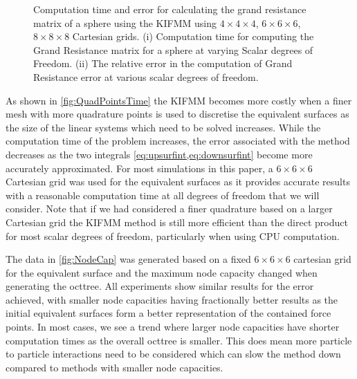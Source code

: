 \begin{figure}[ht]
\begin{subfigure}[b]{0.49\textwidth}
         \caption{\label{fig:QuadPointsError}}
     \end{subfigure}
        \caption[Computation time and error for calculating the grand resistance matrix of a sphere using the KIFMM using $4\times4\times4$, $6\times6\times6$, $8\times8\times8$ Cartesian grids.]{Computation time and error for calculating the grand resistance matrix of a sphere using the KIFMM using $4\times4\times4$, $6\times6\times6$, $8\times8\times8$ Cartesian grids. (i) Computation time for computing the Grand Resistance matrix for a sphere at varying Scalar degrees of Freedom. (ii) The relative error in the computation of Grand Resistance error at various scalar degrees of freedom.}
        \label{fig:QuadPoints}
\end{figure}

As shown in \cref{fig:QuadPointsTime} the KIFMM becomes more costly when a finer mesh with more quadrature points is used to discretise the equivalent surfaces as the size of the linear systems which need to be solved increases. While the computation time of the problem increases, the error associated with the method decreases as the two integrals \cref{eq:upsurfint,eq:downsurfint} become more accurately approximated. For most simulations in this paper, a $6 \times 6 \times 6$ Cartesian grid was used for the equivalent surfaces as it provides accurate results with a reasonable computation time at all degrees of freedom that we will consider. Note that if we had considered a finer quadrature based on a larger Cartesian grid the KIFMM method is still more efficient than the direct product for most scalar degrees of freedom, particularly when using CPU computation. 

The data in \cref{fig:NodeCap} was generated based on a fixed $6\times6\times6$ cartesian grid for the equivalent surface and the maximum node capacity changed when generating the octtree. All experiments show similar results for the error achieved, with smaller node capacities having fractionally better results as the initial equivalent surfaces form a better representation of the contained force points. In most cases, we see a trend where larger node capacities have shorter computation times as the overall octtree is smaller. This does mean more particle to particle interactions need to be considered which can slow the method down compared to methods with smaller node capacities. 

